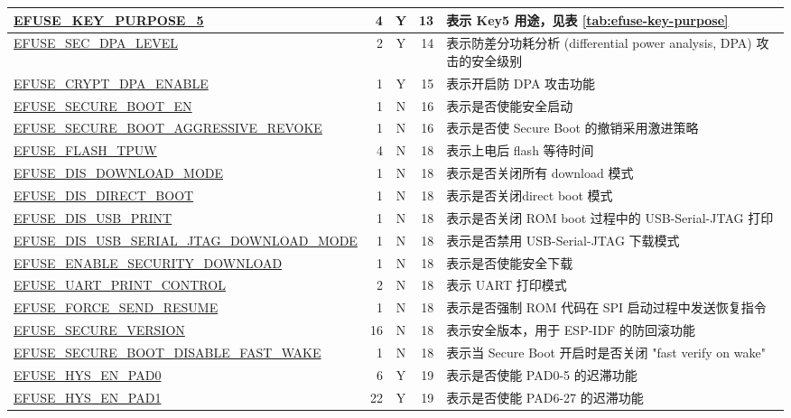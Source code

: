 \begin{longtable}[l]{ |m{8.2cm}|r|c|r|m{9.3cm}| }
    \hline
    \hyperref[fielddesc:EFUSEKEYPURPOSE5]{EFUSE\_KEY\_PURPOSE\_5} & 4 & Y & 13 & {表示 Key5 用途，见表 \ref{tab:efuse-key-purpose}} \\
    \hline
    \hyperref[fielddesc:EFUSESECDPALEVEL]{EFUSE\_SEC\_DPA\_LEVEL} & 2 & Y & 14 & 表示防差分功耗分析 (differential power analysis, DPA)  攻击的安全级别\\
    \hline
    \hyperref[fielddesc:EFUSECRYPTDPAENABLE]{EFUSE\_CRYPT\_DPA\_ENABLE} & 1 & Y & 15 & 表示开启防 DPA 攻击功能 \\
    \hline
    \hyperref[fielddesc:EFUSESECUREBOOTEN]{EFUSE\_SECURE\_BOOT\_EN} & 1 & N & 16 & 表示是否使能安全启动 \\
    \hline
    \hyperref[fielddesc:EFUSESECUREBOOTAGGRESSIVEREVOKE]{EFUSE\_SECURE\_BOOT\_AGGRESSIVE\_REVOKE} & 1 & N & 16 & 表示是否使 Secure Boot 的撤销采用激进策略 \\
    \hline
    \hyperref[fielddesc:EFUSEFLASHTPUW]{EFUSE\_FLASH\_TPUW} & 4 & N & 18 & 表示上电后 flash 等待时间 \\
    \hline
    \hyperref[fielddesc:EFUSEDISDOWNLOADMODE]{EFUSE\_DIS\_DOWNLOAD\_MODE} & 1 & N & 18 & 表示是否关闭所有 download 模式\\
    \hline
    \hyperref[fielddesc:EFUSEDISDIRECTBOOT]{EFUSE\_DIS\_DIRECT\_BOOT} & 1 & N & 18 & 表示是否关闭direct boot 模式\\
    \hline
    \hyperref[fielddesc:EFUSEDISUSBPRINT]{EFUSE\_DIS\_USB\_PRINT} & 1 & N & 18 & 表示是否关闭 ROM boot 过程中的 USB-Serial-JTAG 打印\\
    \hline
    \hyperref[fielddesc:EFUSEDISUSBSERIALJTAGDOWNLOADMODE]{EFUSE\_DIS\_USB\_SERIAL\_JTAG\_DOWNLOAD\_MODE} & 1 & N & 18 & 表示是否禁用 USB-Serial-JTAG 下载模式 \\
    \hline
    \hyperref[fielddesc:EFUSEENABLESECURITYDOWNLOAD]{EFUSE\_ENABLE\_SECURITY\_DOWNLOAD} & 1 & N & 18 & 表示是否使能安全下载 \\
    \hline
    \hyperref[fielddesc:EFUSEUARTPRINTCONTROL]{EFUSE\_UART\_PRINT\_CONTROL} & 2 & N & 18 & 表示 UART 打印模式\\
    \hline
    \hyperref[fielddesc:EFUSEFORCESENDRESUME]{EFUSE\_FORCE\_SEND\_RESUME} & 1 & N & 18 & 表示是否强制 ROM 代码在 SPI 启动过程中发送恢复指令 \\
    \hline
    \hyperref[fielddesc:EFUSESECUREVERSION]{EFUSE\_SECURE\_VERSION} & 16 & N & 18 & 表示安全版本，用于 ESP-IDF 的防回滚功能\\\hline
    \hyperref[fielddesc:EFUSESECUREBOOTDISABLEFASTWAKE]{EFUSE\_SECURE\_BOOT\_DISABLE\_FAST\_WAKE} & 1 & N & 18 & 表示当 Secure Boot 开启时是否关闭 "fast verify on wake"\\\hline
    \hyperref[fielddesc:EFUSEHYSENPAD0]{EFUSE\_HYS\_EN\_PAD0} & 6 & Y & 19 & 表示是否使能 PAD0-5 的迟滞功能\\\hline
    \hyperref[fielddesc:EFUSEHYSENPAD1]{EFUSE\_HYS\_EN\_PAD1} & 22 & Y & 19 & 表示是否使能 PAD6-27 的迟滞功能\\\hline
\end{longtable}